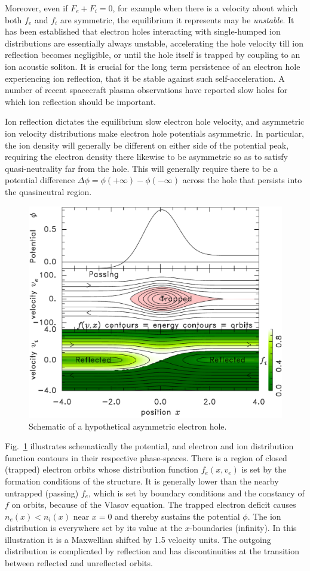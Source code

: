 \documentclass[12pt]{article}
\begin{document}
Moreover, even if $F_e+F_i=0$, for example when there is a velocity
about which both $f_e$ and $f_i$ are symmetric, the equilibrium it
represents may be \emph{unstable}. It has been
established\cite{Hutchinson2021c} that electron holes interacting with
single-humped ion distributions are essentially always
unstable\cite{Eliasson2004}, accelerating the hole velocity till ion
reflection becomes negligible\cite{Zhou2016}, or until the hole itself
is trapped by coupling to an ion acoustic
soliton\cite{Saeki1998,Zhou2017}. It is crucial for the long term
persistence of an electron hole experiencing ion reflection, that it
be stable against such self-acceleration. A number of recent
spacecraft plasma observations have reported slow holes for which ion
reflection should be important\cite{Graham2016,Steinvall2019,Lotekar2020,Kamaletdinov2021}.

Ion reflection dictates the equilibrium slow electron hole velocity,
and asymmetric ion velocity distributions make electron hole
potentials asymmetric. In particular, the ion density will generally
be different on either side of the potential peak, requiring the
electron density there likewise to be asymmetric so as to satisfy
quasi-neutrality far from the hole. This will generally require there
to be a potential difference $\Delta \phi=\phi(+\infty)-\phi(-\infty)$
across the hole that persists into the quasineutral region.

\begin{figure}[htp]
  \centering
  \includegraphics[width=0.6\hsize]{electronholeorbits}
  \caption{Schematic of a hypothetical asymmetric electron hole.}
  \label{fig:electronholeorbits}
\end{figure}
Fig.\ \ref{fig:electronholeorbits} illustrates schematically the
potential, and electron and ion distribution function contours in
their respective phase-spaces. There is a region of closed (trapped) electron
orbits whose distribution function $f_e(x,v_e)$ is set by the
formation conditions of the structure. It is generally lower than the
nearby untrapped (passing) $f_e$, which is set by boundary conditions and the
constancy of $f$ on orbits, because of the Vlasov equation. The
trapped electron deficit causes $n_e(x)<n_i(x)$ near $x=0$ and thereby
sustains the potential $\phi$. The ion distribution is everywhere set
by its value at the $x$-boundaries (infinity). In this illustration it
is a Maxwellian shifted by 1.5 velocity units. The outgoing
distribution is complicated by reflection and has discontinuities at
the transition between reflected and unreflected orbits.
\end{document}
